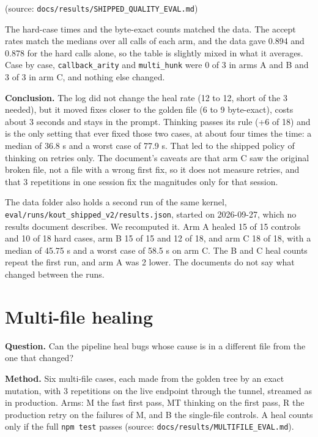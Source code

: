 (source: \texttt{docs/\allowbreak{}results/\allowbreak{}SHIPPED\_\allowbreak{}QUALITY\_\allowbreak{}EVAL.\allowbreak{}md})

The hard-case times and the byte-exact counts matched the data. The accept rates match the medians over all calls of each arm, and the data gave 0.894 and 0.878 for the hard calls alone, so the table is slightly mixed in what it averages. Case by case, \texttt{callback\_\allowbreak{}arity} and \texttt{multi\_\allowbreak{}hunk} were 0 of 3 in arms A and B and 3 of 3 in arm C, and nothing else changed.

\textbf{Conclusion.} The log did not change the heal rate (12 to 12, short of the 3 needed), but it moved fixes closer to the golden file (6 to 9 byte-exact), costs about 3 seconds and stays in the prompt. Thinking passes its rule (+6 of 18) and is the only setting that ever fixed those two cases, at about four times the time: a median of 36.8 s and a worst case of 77.9 s. That led to the shipped policy of thinking on retries only. The document's caveats are that arm C saw the original broken file, not a file with a wrong first fix, so it does not measure retries, and that 3 repetitions in one session fix the magnitudes only for that session.

The data folder also holds a second run of the same kernel, \texttt{eval/\allowbreak{}runs/\allowbreak{}kout\_\allowbreak{}shipped\_\allowbreak{}v2/\allowbreak{}results.\allowbreak{}json}, started on 2026-09-27, which no results document describes. We recomputed it. Arm A healed 15 of 15 controls and 10 of 18 hard cases, arm B 15 of 15 and 12 of 18, and arm C 18 of 18, with a median of 45.75 s and a worst case of 58.5 s on arm C. The B and C heal counts repeat the first run, and arm A was 2 lower. The documents do not say what changed between the runs.

\section{Multi-file healing}

\textbf{Question.} Can the pipeline heal bugs whose cause is in a different file from the one that changed?

\textbf{Method.} Six multi-file cases, each made from the golden tree by an exact mutation, with 3 repetitions on the live endpoint through the tunnel, streamed as in production. Arms: M the fast first pass, MT thinking on the first pass, R the production retry on the failures of M, and B the single-file controls. A heal counts only if the full \texttt{npm test} passes (source: \texttt{docs/\allowbreak{}results/\allowbreak{}MULTIFILE\_\allowbreak{}EVAL.\allowbreak{}md}).

